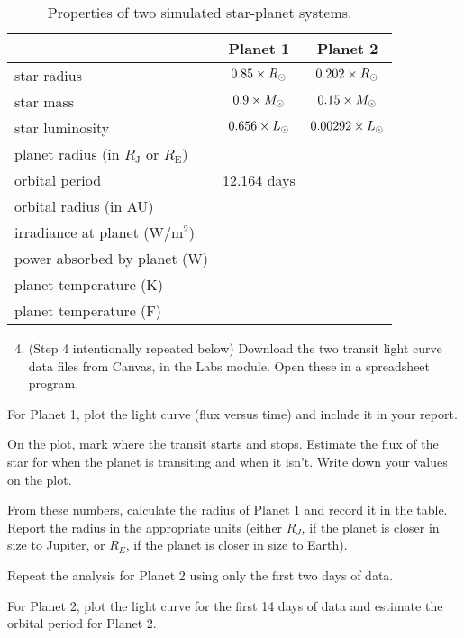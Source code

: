 \begin{table}
	\centering
	\begin{tabular}{l|c|c}
		\toprule
		& Planet 1 & Planet 2 \\
		\midrule
		star radius & $0.85 \times R_\textrm{\astrosun}$ & $0.202 \times R_\textrm{\astrosun}$  \\
		\midrule
		star mass & $0.9 \times M_\textrm{\astrosun}$ & $0.15 \times M_\textrm{\astrosun}$ \\
		\midrule
		star luminosity & $0.656 \times L_\textrm{\astrosun}$ & $0.00292 \times L_\textrm{\astrosun}$ \\
		\midrule
		planet radius (in $R_\textrm{J}$ or $R_\textrm{E}$) & & \\
		orbital period & 12.164 days & \\
		\midrule
		orbital radius (in AU) & & \\
		\midrule
		irradiance at planet (W$/$m$^2$) & & \\
		\midrule
		power absorbed by planet (W) & & \\
		\midrule
		planet temperature (K) & & \\
		\midrule
		planet temperature (\textdegree F) & & \\
		\bottomrule
	\end{tabular}
	\caption{Properties of two simulated star-planet systems.}\label{tr:tab:properties}
\end{table}

\begin{enumerate}
	\setcounter{enumi}{3}
	\item (Step 4 intentionally repeated below) Download the two transit light curve data files from Canvas, in the Labs module. Open these in a spreadsheet program.
\end{enumerate}

\begin{steps}	
	\item For Planet 1, plot the light curve (flux versus time) and include it in your report.

	\item On the plot, mark where the transit starts
and stops. Estimate the flux of the star for when the planet is transiting
and when it isn’t. Write down your values on the plot.

	\item From these
numbers, calculate the radius of Planet 1 and record it in the table.
Report the radius in the appropriate units (either $R_J$, if the planet is
closer in size to Jupiter, or $R_E$, if the planet is closer in size to Earth).

	\item Repeat the analysis for Planet 2 using only the first two days of data.

	\item For Planet 2, plot the light curve for the first 14 days of data and
estimate the orbital period for Planet 2.
\end{steps}

